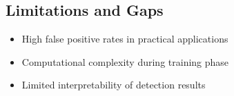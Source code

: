 \subsection*{Limitations and Gaps}
\begin{itemize}
\item High false positive rates in practical applications
\item Computational complexity during training phase
\item Limited interpretability of detection results
\end{itemize}